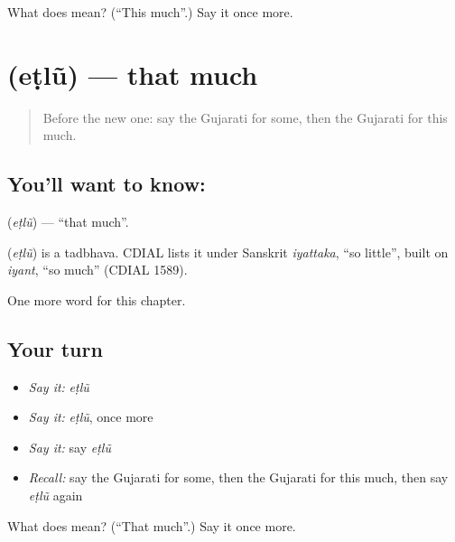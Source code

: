 \begin{tcolorbox}[breakable,colback=teal!4,colframe=teal!35!black,title={Before you move on}]
What does  mean? (\textquotedblleft{}This much\textquotedblright{}.) Say it once more.
\end{tcolorbox}
\section[\texorpdfstring{\gu{એટલું} (eṭlũ)}{એટલું (eṭlũ)}]{ (eṭlũ) — that much}

\label{lesson:GU-C101-etlu}



\begin{quote}
Before the new one: say the Gujarati for some, then the Gujarati for this much.
\end{quote}

\subsection*{You'll want to know: }
\textbf{} (\emph{eṭlũ}) — \textquotedblleft{}that much\textquotedblright{}.

\begin{cousinweb}
\textbf{} (\emph{eṭlũ}) is a tadbhava. CDIAL lists it under Sanskrit \emph{iyattaka}, \textquotedblleft{}so little\textquotedblright{}, built on \emph{iyant}, \textquotedblleft{}so much\textquotedblright{} (CDIAL 1589).
\end{cousinweb}

\begin{grammarlens}[title={What you've built}]
One more word for this chapter.
\end{grammarlens}

\subsection*{Your turn}
\begin{itemize}
\raggedright
  \item \emph{Say it:} \emph{eṭlũ}
  \item \emph{Say it:} \emph{eṭlũ}, once more
  \item \emph{Say it:} say \emph{eṭlũ}
  \item \emph{Recall:} say the Gujarati for some, then the Gujarati for this much, then say \emph{eṭlũ} again
\end{itemize}

\begin{tcolorbox}[breakable,colback=teal!4,colframe=teal!35!black,title={Before you move on}]
What does  mean? (\textquotedblleft{}That much\textquotedblright{}.) Say it once more.
\end{tcolorbox}
